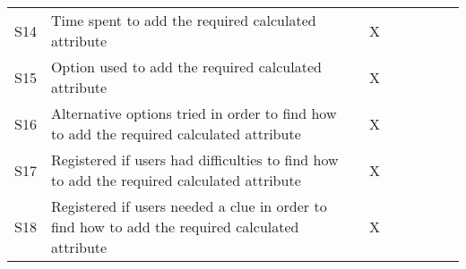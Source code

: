 \begin{longtable}{@{}lm{7cm}ccccccc@{}}
    S14         & Time spent to add the required calculated attribute                                                                                                     &                                                & X                                              &                                                &                                                &                                                &                                                &                                                \\
    S15         & Option used to add the required calculated attribute                                                                                                    &                                                & X                                              &                                                &                                                &                                                &                                                &                                                \\
    S16         & Alternative options tried in order to find how to add the required calculated attribute                                                                 &                                                & X                                              &                                                &                                                &                                                &                                                &                                                \\
    S17         & Registered if users had difficulties to find how to add the required calculated attribute                                                               &                                                & X                                              &                                                &                                                &                                                &                                                &                                                \\
    S18         & Registered if users needed a clue in order to find how to add the required calculated attribute                                                         &                                                & X                                              &                                                &                                                &                                                &                                                &                                                \\* \midrule

\end{longtable}
